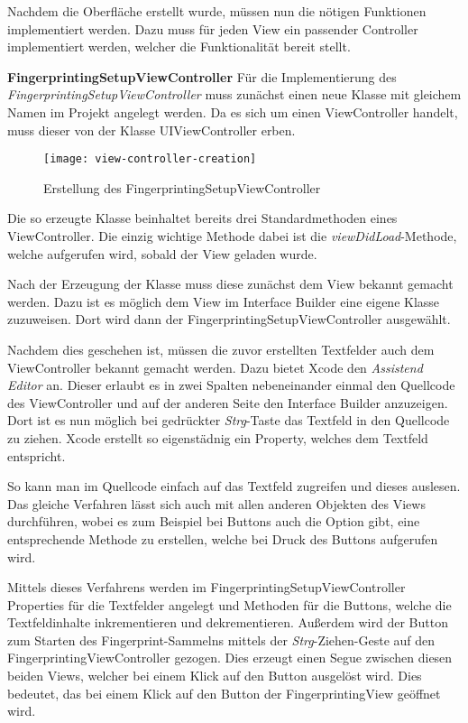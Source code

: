Nachdem die Oberfläche erstellt wurde, müssen nun die nötigen Funktionen implementiert werden. 
Dazu muss für jeden View ein passender Controller implementiert werden, welcher die Funktionalität bereit stellt.


\textbf{FingerprintingSetupViewController}
Für die Implementierung des \emph{FingerprintingSetupViewController} muss zunächst einen neue Klasse mit gleichem Namen im Projekt angelegt werden. 
Da es sich um einen ViewController handelt, muss dieser von der Klasse UIViewController erben.

\begin{figure}[htb!]
		\centering
	\texttt{[image: view-controller-creation]}
	\caption{Erstellung des FingerprintingSetupViewController}
	\label{view-controller-creation}
\end{figure}

Die so erzeugte Klasse beinhaltet bereits drei Standardmethoden eines ViewController. Die einzig wichtige Methode dabei ist die \emph{viewDidLoad}-Methode, welche aufgerufen wird, sobald der View geladen wurde.
 
Nach der Erzeugung der Klasse muss diese zunächst dem View bekannt gemacht werden. Dazu ist es möglich dem View im Interface Builder eine eigene Klasse zuzuweisen. Dort wird dann der FingerprintingSetupViewController ausgewählt.

Nachdem dies geschehen ist, müssen die zuvor erstellten Textfelder auch dem ViewController bekannt gemacht werden. Dazu bietet Xcode den \emph{Assistend Editor} an. Dieser erlaubt es in zwei Spalten nebeneinander einmal den Quellcode des ViewController und auf der anderen Seite den Interface Builder anzuzeigen. Dort ist es nun möglich bei gedrückter \emph{Strg}-Taste das Textfeld in den Quellcode zu ziehen.
Xcode erstellt so eigenstädnig ein Property, welches dem Textfeld entspricht.

So kann man im Quellcode einfach auf das Textfeld zugreifen und dieses auslesen. Das gleiche Verfahren lässt sich auch mit allen anderen Objekten des Views durchführen, wobei es zum Beispiel bei Buttons auch die Option gibt, eine entsprechende Methode zu erstellen, welche bei Druck des Buttons aufgerufen wird.

Mittels dieses Verfahrens werden im FingerprintingSetupViewController Properties für die Textfelder angelegt und Methoden für die Buttons, welche die Textfeldinhalte inkrementieren und dekrementieren.
Außerdem wird der Button zum Starten des Fingerprint-Sammelns mittels der \emph{Strg}-Ziehen-Geste auf den FingerprintingViewController gezogen. Dies erzeugt einen Segue zwischen diesen beiden Views, welcher bei einem Klick auf den Button ausgelöst wird. Dies bedeutet, das bei einem Klick auf den Button der FingerprintingView geöffnet wird.

